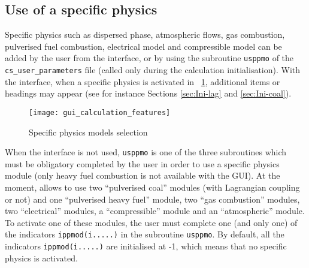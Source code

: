 {{\subsection{Use of a specific physics}
\label{sec:prg_usppmo}%
Specific physics such as dispersed phase, atmospheric flows, gas combustion,
pulverised fuel combustion, electrical model and compressible model can be
added by the user from the interface, or by using the subroutine \texttt{usppmo} of
the \texttt{cs\_user\_parameters} file (called only during the calculation initialisation).
With the interface, when a specific physics is activated in \figurename~\ref{fig:5_GUI},
additional items or headings may appear (see for instance Sections \ref{sec:Ini-lag}
and \ref{sec:Ini-coal}).

\begin{figure}[!ht]
\begin{center}
\texttt{[image: gui\_calculation\_features]}
\caption{Specific physics models selection}
\label{fig:5_GUI}
\end{center}
\end{figure}

When the interface is not used, \texttt{usppmo} is one of the three subroutines
which must be obligatory completed by the user in order to use a specific physics module
(only heavy fuel combustion is not available with the GUI).
At the moment, \CS allows to use two ``pulverised coal'' modules
(with Lagrangian coupling or not) and one ``pulverised heavy fuel'' module,
two ``gas combustion'' modules, two ``electrical'' modules,
a ``compressible'' module and an ``atmospheric'' module. To activate one of
these modules, the user must complete one (and only one) of the
indicators \texttt{ippmod(i.....)} in the subroutine
\texttt{usppmo}. By default, all the indicators \texttt{ippmod(i.....)} are
initialised at -1, which means that no specific physics is activated.

}}
